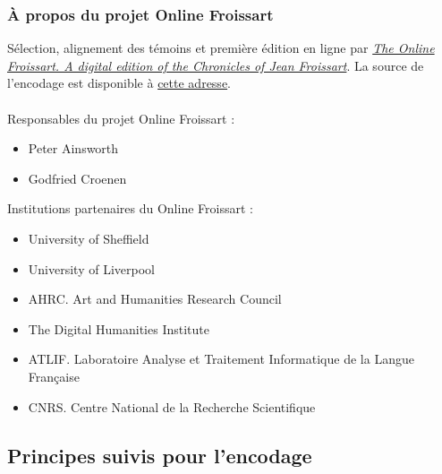 \documentclass[12pt, a4paper]{article}
\begin{document}
	\subsubsection{À propos du projet Online Froissart}
	Sélection, alignement des témoins et première édition en ligne par \href{https://www.dhi.ac.uk/onlinefroissart}{\textit{The Online Froissart. A digital edition of the Chronicles of Jean Froissart}}. La source de l'encodage est disponible à \href{https://www.dhi.ac.uk/onlinefroissart/browsey.jsp?f=b&pb2=Ber-3_SHF_3A-307&disp2=shf&GlobalWord=0&div2=ms.f.transc.Ber-3&div1=ms.f.transc.Bre-3&div0=ms.f.transc.Ant-3&panes=3&GlobalMode=shf&img0=&disp0=shf&disp1=shf&pb1=Bre-3_SHF_3A-307&img2=&GlobalShf=3A-306&pb0=Ant-3_SHF_3A-307&img1=}{cette adresse}.\\~\\
	\noindent Responsables du projet Online Froissart : \begin{itemize}\item{
			Peter
			Ainsworth
		} \item{
			Godfried
			Croenen
	} \end{itemize} \noindent Institutions partenaires du Online Froissart : \begin{itemize}\item{University of Sheffield} \item{University of Liverpool} \item{AHRC. Art and Humanities Research Council} \item{The Digital Humanities Institute} \item{ATLIF. Laboratoire Analyse et Traitement Informatique de la Langue Française} \item{CNRS. Centre National de la Recherche Scientifique} \end{itemize} 
	\subsection{Principes suivis pour l'encodage}
\end{document}
